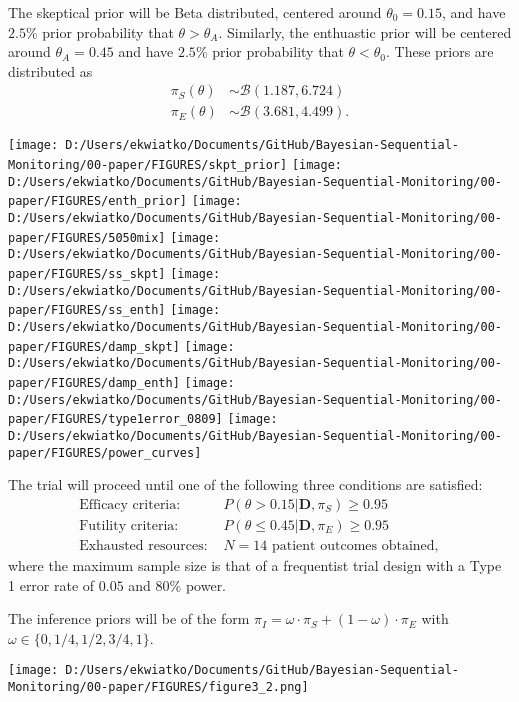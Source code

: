 \documentclass[12pt]{article}
\begin{document}
The skeptical prior will be Beta distributed, centered around $\theta_0=0.15$, and have $2.5\%$ prior probability that $\theta>\theta_A$. Similarly, the enthuastic prior will be centered around $\theta_A=0.45$ and have $2.5\%$ prior probability that $\theta<\theta_0$. These priors are distributed as
\begin{align*}
\pi_S(\theta)&\sim\mathcal{B}(1.187,6.724)\\
\pi_E(\theta)&\sim\mathcal{B}(3.681,4.499).
\end{align*}
\begin{center}
\texttt{[image: D:/Users/ekwiatko/Documents/GitHub/Bayesian-Sequential-Monitoring/00-paper/FIGURES/skpt\_prior]}
\texttt{[image: D:/Users/ekwiatko/Documents/GitHub/Bayesian-Sequential-Monitoring/00-paper/FIGURES/enth\_prior]}
\texttt{[image: D:/Users/ekwiatko/Documents/GitHub/Bayesian-Sequential-Monitoring/00-paper/FIGURES/5050mix]}
\texttt{[image: D:/Users/ekwiatko/Documents/GitHub/Bayesian-Sequential-Monitoring/00-paper/FIGURES/ss\_skpt]}
\texttt{[image: D:/Users/ekwiatko/Documents/GitHub/Bayesian-Sequential-Monitoring/00-paper/FIGURES/ss\_enth]}
\texttt{[image: D:/Users/ekwiatko/Documents/GitHub/Bayesian-Sequential-Monitoring/00-paper/FIGURES/damp\_skpt]}
\texttt{[image: D:/Users/ekwiatko/Documents/GitHub/Bayesian-Sequential-Monitoring/00-paper/FIGURES/damp\_enth]}
\texttt{[image: D:/Users/ekwiatko/Documents/GitHub/Bayesian-Sequential-Monitoring/00-paper/FIGURES/type1error\_0809]}
\texttt{[image: D:/Users/ekwiatko/Documents/GitHub/Bayesian-Sequential-Monitoring/00-paper/FIGURES/power\_curves]}
\end{center}
The trial will proceed until one of the following three conditions are satisfied:
\begin{align*}
\text{Efficacy criteria: }&P(\theta>0.15|\mathbf{D},\pi_S)\geq 0.95\\
\text{Futility criteria: }&P(\theta\leq 0.45|\mathbf{D},\pi_E)\geq 0.95\\
\text{Exhausted resources: }&N=14 \text{ patient outcomes obtained},
\end{align*}
where the maximum sample size is that of a frequentist trial design with a Type 1 error rate of $0.05$ and $80\%$ power.

The inference priors will be of the form $\pi_{I}=\omega\cdot\pi_{S}+(1-\omega)\cdot\pi_E$ with $\omega\in\{0,1/4,1/2,3/4,1\}$.
\begin{center}
\texttt{[image: D:/Users/ekwiatko/Documents/GitHub/Bayesian-Sequential-Monitoring/00-paper/FIGURES/figure3\_2.png]}
\end{center}
\end{document}
